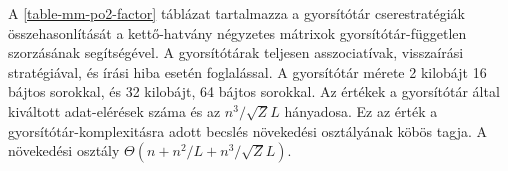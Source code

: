 \documentclass[12pt]{report}
\begin{document}
A \ref{table-mm-po2-factor} táblázat tartalmazza
a gyorsítótár cserestratégiák összehasonlítását
a kettő-hatvány négyzetes mátrixok gyorsítótár-független szorzásának
segítségével.
A gyorsítótárak teljesen asszociatívak,
visszaírási stratégiával, és írási hiba esetén foglalással.
A gyorsítótár mérete 2 kilobájt 16 bájtos sorokkal,
és 32 kilobájt, 64 bájtos sorokkal.
Az értékek a gyorsítótár által kiváltott adat-elérések száma
és az $n^3 / \sqrt{Z}L$ hányadosa.
Ez az érték a gyorsítótár-komplexitásra adott becslés növekedési osztályának
köbös tagja.
A növekedési osztály $\Theta(n+n^2/L+n^3/\sqrt{Z}L)$.
\end{document}
